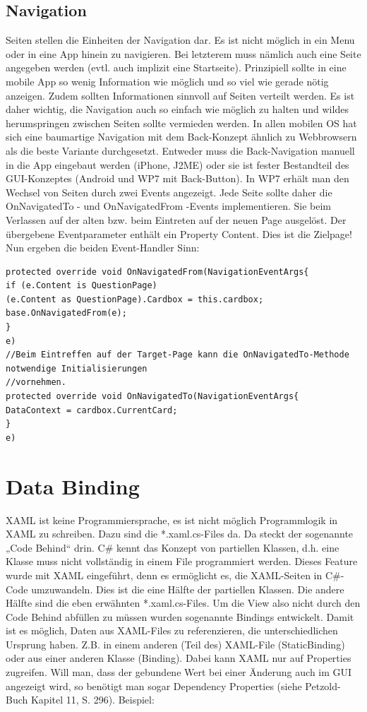 \documentclass[a4paper,10pt]{scrreprt}
\begin{document}
\subsection{Navigation}
Seiten stellen die Einheiten der Navigation dar. Es ist nicht möglich in ein Menu oder in eine App hinein zu
navigieren. Bei letzterem muss nämlich auch eine Seite angegeben werden (evtl. auch implizit eine Startseite).
Prinzipiell sollte in eine mobile App so wenig Information wie möglich und so viel wie gerade nötig anzeigen.
Zudem sollten Informationen sinnvoll auf Seiten verteilt werden. Es ist daher wichtig, die Navigation auch so
einfach wie möglich zu halten und wildes herumspringen zwischen Seiten sollte vermieden werden.
In allen mobilen OS hat sich eine baumartige Navigation mit dem Back-Konzept ähnlich zu Webbrowsern als die
beste Variante durchgesetzt. Entweder muss die Back-Navigation manuell in die App eingebaut werden (iPhone,
J2ME) oder sie ist fester Bestandteil des GUI-Konzeptes (Android und WP7 mit Back-Button).
In WP7 erhält man den Wechsel von Seiten durch zwei Events angezeigt. Jede Seite sollte daher die
OnNavigatedTo - und OnNavigatedFrom -Events implementieren. Sie beim Verlassen auf der alten bzw. beim
Eintreten auf der neuen Page ausgelöst. Der übergebene Eventparameter enthält ein Property Content. Dies ist
die Zielpage! Nun ergeben die beiden Event-Handler Sinn:

\begin{lstlisting}[caption=Navigation]
 protected override void OnNavigatedFrom(NavigationEventArgs{
if (e.Content is QuestionPage)
(e.Content as QuestionPage).Cardbox = this.cardbox;
base.OnNavigatedFrom(e);
}
e)
//Beim Eintreffen auf der Target-Page kann die OnNavigatedTo-Methode notwendige Initialisierungen
//vornehmen.
protected override void OnNavigatedTo(NavigationEventArgs{
DataContext = cardbox.CurrentCard;
}
e)

\end{lstlisting}

\section{Data Binding}
XAML ist keine Programmiersprache, es ist nicht möglich Programmlogik in XAML zu schreiben. Dazu sind die
*.xaml.cs-Files da. Da steckt der sogenannte „Code Behind“ drin. C\# kennt das Konzept von partiellen Klassen,
d.h. eine Klasse muss nicht vollständig in einem File programmiert werden. Dieses Feature wurde mit XAML
eingeführt, denn es ermöglicht es, die XAML-Seiten in C\#-Code umzuwandeln. Dies ist die eine Hälfte der
partiellen Klassen. Die andere Hälfte sind die eben erwähnten *.xaml.cs-Files.
Um die View also nicht durch den Code Behind abfüllen zu müssen wurden sogenannte Bindings entwickelt.
Damit ist es möglich, Daten aus XAML-Files zu referenzieren, die unterschiedlichen Ursprung haben. Z.B. in
einem anderen (Teil des) XAML-File (StaticBinding) oder aus einer anderen Klasse (Binding). Dabei kann XAML
nur auf Properties zugreifen. Will man, dass der gebundene Wert bei einer Änderung auch im GUI angezeigt
wird, so benötigt man sogar Dependency Properties (siehe Petzold-Buch Kapitel 11, S. 296). Beispiel:
\end{document}

